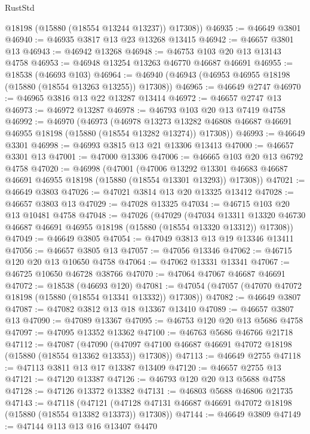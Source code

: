 \begin{lexlean}{RustStd}
\begin{coremodule}
        @18198
        (@15880 (@18554 @13244 @13237))
        @17308))
@46935 := @46649 @3801
@46940 := @46935 @3817 @13 @23 @13268 @13415
@46942 := @46657 @3801 @13
@46943 := @46942 @13268
@46948 := @46753 @103 @20 @13 @13143 @4758
@46953 := @46948 @13254 @13263 @46770 @46687 @46691
@46955 := @18538 (@46693 @103)
@46964 := @46940 (@46943 (@46953 @46955 @18198 (@15880 (@18554 @13263 @13255)) @17308))
@46965 := @46649 @2747
@46970 := @46965 @3816 @13 @22 @13287 @13414
@46972 := @46657 @2747 @13
@46973 := @46972 @13287
@46978 := @46793 @103 @20 @13 @7419 @4758
@46992 := @46970
    (@46973
      (@46978
        @13273
        @13282
        @46808
        @46687
        @46691
        @46955
        @18198
        (@15880 (@18554 @13282 @13274))
        @17308))
@46993 := @46649 @3301
@46998 := @46993 @3815 @13 @21 @13306 @13413
@47000 := @46657 @3301 @13
@47001 := @47000 @13306
@47006 := @46665 @103 @20 @13 @6792 @4758
@47020 := @46998
    (@47001
      (@47006
        @13292
        @13301
        @46683
        @46687
        @46691
        @46955
        @18198
        (@15880 (@18554 @13301 @13293))
        @17308))
@47021 := @46649 @3803
@47026 := @47021 @3814 @13 @20 @13325 @13412
@47028 := @46657 @3803 @13
@47029 := @47028 @13325
@47034 := @46715 @103 @20 @13 @10481 @4758
@47048 := @47026
    (@47029
      (@47034
        @13311
        @13320
        @46730
        @46687
        @46691
        @46955
        @18198
        (@15880 (@18554 @13320 @13312))
        @17308))
@47049 := @46649 @3805
@47054 := @47049 @3813 @13 @19 @13346 @13411
@47056 := @46657 @3805 @13
@47057 := @47056 @13346
@47062 := @46715 @120 @20 @13 @10650 @4758
@47064 := @47062 @13331 @13341
@47067 := @46725 @10650 @46728 @38766
@47070 := @47064 @47067 @46687 @46691
@47072 := @18538 (@46693 @120)
@47081 := @47054 (@47057 (@47070 @47072 @18198 (@15880 (@18554 @13341 @13332)) @17308))
@47082 := @46649 @3807
@47087 := @47082 @3812 @13 @18 @13367 @13410
@47089 := @46657 @3807 @13
@47090 := @47089 @13367
@47095 := @46753 @120 @20 @13 @5686 @4758
@47097 := @47095 @13352 @13362
@47100 := @46763 @5686 @46766 @21718
@47112 := @47087
    (@47090 (@47097 @47100 @46687 @46691 @47072 @18198 (@15880 (@18554 @13362 @13353)) @17308))
@47113 := @46649 @2755
@47118 := @47113 @3811 @13 @17 @13387 @13409
@47120 := @46657 @2755 @13
@47121 := @47120 @13387
@47126 := @46793 @120 @20 @13 @5688 @4758
@47128 := @47126 @13372 @13382
@47131 := @46803 @5688 @46806 @21735
@47143 := @47118
    (@47121 (@47128 @47131 @46687 @46691 @47072 @18198 (@15880 (@18554 @13382 @13373)) @17308))
@47144 := @46649 @3809
@47149 := @47144 @113 @13 @16 @13407 @4470

\end{coremodule}
\end{lexlean}
